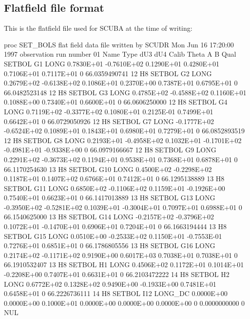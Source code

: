 \documentclass[twoside,11pt,nolof]{starlink}
\begin{document}
\begin{landscape}
\section{Flatfield file format\label{app:ff}}

This is the flatfield file used for SCUBA at the time of writing:

\begin{small}
\begin{terminalv}
proc SET_BOLS
{ flat field data file written by SCUDR
{ Mon Jun 16 17:20:00 1997
{ observation run number 01
{      Name Type      dU3         dU4         Calib       Theta       A           B         Qual
 SETBOL G1  LONG      0.7830E+01 -0.7610E+02  0.1290E+01  0.4280E+01  0.7106E+01  0.7117E+01  0  66.0359490741  12 H8
 SETBOL G2  LONG      0.2679E+02 -0.6138E+02  0.1086E+01  0.2370E+00  0.7387E+01  0.6795E+01  0  66.0482523148  12 H8
 SETBOL G3  LONG      0.4785E+02 -0.4588E+02  0.1160E+01  0.1088E+00  0.7340E+01  0.6600E+01  0  66.0606250000  12 H8
 SETBOL G4  LONG      0.7119E+02 -0.3377E+02  0.1080E+01  0.2125E-01  0.7499E+01  0.6642E+01  0  66.0729050926  12 H8
 SETBOL G7  LONG     -0.1777E+02 -0.6524E+02  0.1089E+01  0.1843E+01  0.6980E+01  0.7279E+01  0  66.0852893519  12 H8
 SETBOL G8  LONG      0.2193E+01 -0.4958E+02  0.1032E+01 -0.1701E+02 -0.4981E+01 -0.9338E+00  0  66.0979166667  12 H8
 SETBOL G9  LONG      0.2291E+02 -0.3673E+02  0.1194E+01  0.9538E+01  0.7368E+01  0.6878E+01  0  66.1170254630  13 H8
 SETBOL G10 LONG      0.4500E+02 -0.2298E+02  0.1187E+01  0.1407E+02  0.6766E+01  0.7412E+01  0  66.1295138889  13 H8
 SETBOL G11 LONG      0.6850E+02 -0.1106E+02  0.1159E+01 -0.1926E+00  0.7540E+01  0.6623E+01  0  66.1417013889  13 H8
 SETBOL G13 LONG     -0.3950E+02 -0.5281E+02  0.1039E+01 -0.3004E+01  0.7097E+01  0.6988E+01  0  66.1540625000  13 H8
 SETBOL G14 LONG     -0.2157E+02 -0.3796E+02  0.1072E+01 -0.1470E+01  0.6906E+01  0.7204E+01  0  66.1663194444  13 H8
 SETBOL G15 LONG      0.0510E+00 -0.2533E+02  0.1150E+01 -0.7553E-01  0.7276E+01  0.6851E+01  0  66.1786805556  13 H8
 SETBOL G16 LONG      0.2174E+02 -0.1171E+02  0.9190E+00  0.6017E+03  0.7038E+01  0.7038E+01  0  66.1910532407  13 H8
 SETBOL H1  LONG      0.4506E+02  0.1172E+01  0.1014E+01 -0.2208E+00  0.7407E+01  0.6631E+01  0  66.2103472222  14 H8
 SETBOL H2  LONG      0.6772E+02  0.1328E+02  0.9490E+00 -0.1933E+00  0.7481E+01  0.6458E+01  0  66.2226736111  14 H8
 SETBOL I12 LONG_DC   0.0000E+00  0.0000E+00  0.1000E+01  0.0000E+00  0.0000E+00  0.0000E+00  0   0.0000000000   0 NUL
}}}}
\end{terminalv}
\end{small}
\end{landscape}
\end{document}
